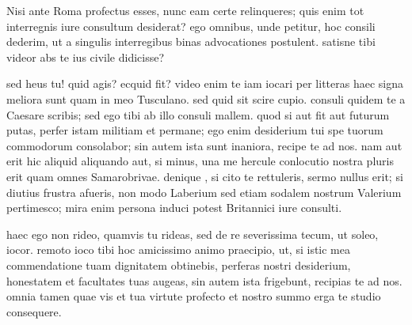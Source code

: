 


 Nisi ante Roma profectus esses, nunc eam certe relinqueres; quis enim tot interregnis iure consultum desiderat? ego omnibus, unde petitur, hoc consili dederim, ut a singulis interregibus binas advocationes postulent. satisne tibi videor abs te ius civile didicisse?

 sed heus tu! quid agis? ecquid fit? video enim te iam iocari per litteras haec signa meliora sunt quam in meo Tusculano. sed quid sit scire cupio. consuli quidem te a Caesare scribis; sed ego tibi ab illo consuli mallem. quod si aut fit aut futurum putas, perfer istam militiam et permane; ego enim desiderium tui spe tuorum commodorum consolabor; sin autem ista sunt inaniora, recipe te ad nos. nam aut erit hic aliquid aliquando aut, si minus, una me hercule conlocutio nostra pluris erit quam omnes Samarobrivae. denique , si cito te rettuleris, sermo nullus erit; si diutius frustra afueris, non modo Laberium sed etiam sodalem nostrum Valerium pertimesco; mira enim persona induci potest Britannici iure consulti.

 haec ego non rideo, quamvis tu rideas, sed de re severissima tecum, ut soleo, iocor. remoto ioco tibi hoc amicissimo animo praecipio, ut, si istic mea commendatione tuam dignitatem obtinebis, perferas nostri desiderium, honestatem et facultates tuas augeas, sin autem ista frigebunt, recipias te ad nos. omnia tamen quae vis et tua virtute profecto et nostro summo erga te studio consequere.
